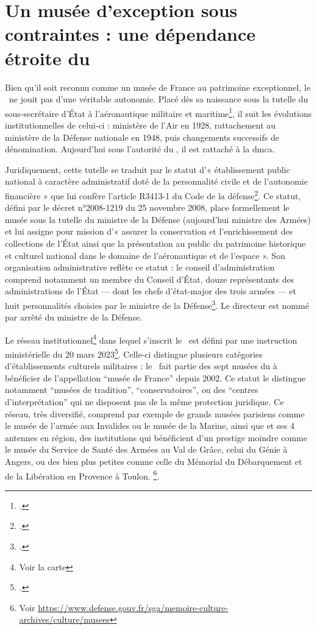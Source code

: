 \section{\label{I-B-1}Un musée d'exception sous contraintes : une dépendance étroite du \minarm}

Bien qu'il soit reconnu comme un musée de France au patrimoine exceptionnel, le \mae~ne jouit pas d'une véritable autonomie. Placé dès sa naissance sous la tutelle du sous-secrétaire d'État à l'aéronautique militaire et maritime\footcite{terrierAeroportParisBourget2019}, il suit les évolutions institutionnelles de celui-ci : ministère de l'Air en 1928, rattachement au ministère de la Défense nationale en 1948, puis changements successifs de dénomination. Aujourd'hui sous l'autorité du \minarm, il est rattaché à la \gls{dmca}.

Juridiquement, cette tutelle se traduit par le statut d'« établissement public national à caractère administratif doté de la personnalité civile et de l'autonomie financière » que lui confère l'article R3413-1 du Code de la défense\footcite{ArticleR34131Code2008}. Ce statut, défini par le décret n°2008-1219 du 25 novembre 2008, place formellement le musée sous la tutelle du ministre de la Défense (aujourd'hui ministre des Armées) et lui assigne pour mission d'« assurer la conservation et l'enrichissement des collections de l'État ainsi que la présentation au public du patrimoine historique et culturel national dans le domaine de l'aéronautique et de l'espace ». Son organisation administrative reflète ce statut : le conseil d'administration comprend notamment un membre du Conseil d'État, douze représentants des administrations de l'État — dont les chefs d'état-major des trois armées — et huit personnalités choisies par le ministre de la Défense\footcite{ArticleR341373Code2013}. Le directeur est nommé par arrêté du ministre de la Défense.

Le réseau institutionnel\footnote{Voir la carte } dans lequel s'inscrit le \mae~est défini par une instruction ministérielle du 20 mars 2023\footcite{ministeredesarmeesInstructionNdeg303ARM2023}.
Celle-ci distingue plusieurs catégories d'établissements culturels militaires : le \mae~fait partie des sept musées du \minarm à bénéficier de l'appellation \enquote{musée de France} depuis 2002. Ce statut le distingue notamment \enquote{musées de tradition}, \enquote{conservatoires}, ou des \enquote{centres d'interprétation} qui ne disposent pas de la même protection juridique. Ce réseau, très diversifié, comprend par exemple de grands musées parisiens comme le musée de l'armée aux Invalides ou le musée de la Marine, ainsi que et ses 4 antennes en région, des institutions qui bénéficient d'un prestige moindre comme le musée du Service de Santé des Armées au Val de Grâce, celui du Génie à Angers, ou des bien plus petites comme celle du Mémorial du Débarquement et de la Libération en Provence à Toulon.
\footnote{Voir \url{https://www.defense.gouv.fr/sga/memoire-culture-archives/culture/musees}}.



